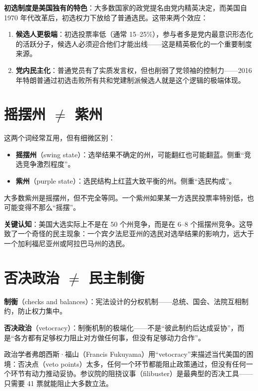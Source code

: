 \documentclass[12pt,a4paper]{ctexart}
\begin{document}
\textbf{初选制度是美国独有的特色}：大多数国家的政党提名由党内精英决定，而美国自 1970 年代改革后，初选权力下放给了普通选民。这带来两个效应：

\begin{enumerate}
  \item \textbf{候选人更极端}：初选投票率低（通常 15--25\%），参与者多是党内最意识形态化的活跃分子，候选人必须迎合他们才能出线——这是精英极化的一个重要制度来源。
  \item \textbf{党内民主化}：普通党员有了实质发言权，但也削弱了党领袖的控制力——2016 年特朗普通过初选击败所有共和党建制派候选人就是这个逻辑的极端体现。
\end{enumerate}

\section{摇摆州 $\neq$ 紫州}

这两个词经常互用，但有细微区别：

\begin{itemize}
  \item \textbf{摇摆州}（swing state）：选举结果不确定的州，可能翻红也可能翻蓝。侧重``竞选竞争激烈程度''。
  \item \textbf{紫州}（purple state）：选民结构上红蓝大致平衡的州。侧重``选民构成''。
\end{itemize}

大多数紫州是摇摆州，但不完全等同。一个紫州如果某一方选民投票率特别低，也可能变得不那么``摇摆''。

\textbf{关键认知}：美国大选实际上不是在 50 个州竞争，而是在 6--8 个摇摆州竞争。这导致了一个奇怪的民主现象：一个宾夕法尼亚州的选民对选举结果的影响力，远大于一个加利福尼亚州或阿拉巴马州的选民。

\section{否决政治 $\neq$ 民主制衡}

\textbf{制衡}（checks and balances）：宪法设计的分权机制——总统、国会、法院互相制约，防止权力集中。

\textbf{否决政治}（vetocracy）：制衡机制的极端化——不是``彼此制约后达成妥协''，而是``各方都有足够权力阻止对方做任何事，但没有足够动力合作''。

政治学者弗朗西斯·福山（Francis Fukuyama）用``vetocracy''来描述当代美国的困境：否决点（veto points）太多，任何一个环节都能阻止政策通过，但没有任何一个环节有动力推动妥协。参议院的阻挠议事（filibuster）是最典型的否决工具——只需要 41 票就能阻止大多数立法。
\end{document}
